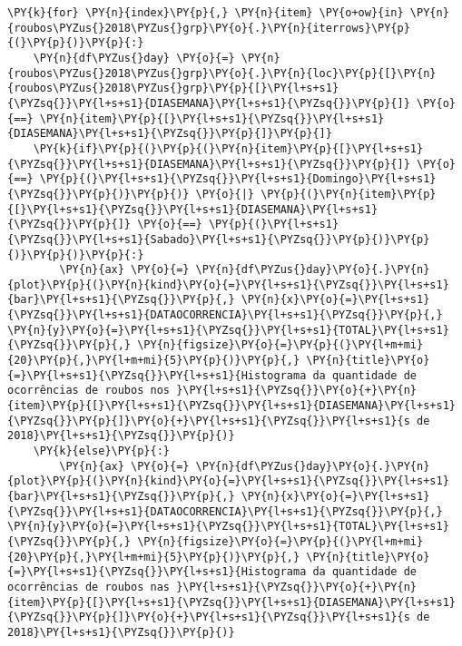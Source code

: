     \begin{tcolorbox}[breakable, size=fbox, boxrule=1pt, pad at break*=1mm,colback=cellbackground, colframe=cellborder]
\begin{Verbatim}[commandchars=\\\{\}]
\PY{k}{for} \PY{n}{index}\PY{p}{,} \PY{n}{item} \PY{o+ow}{in} \PY{n}{roubos\PYZus{}2018\PYZus{}grp}\PY{o}{.}\PY{n}{iterrows}\PY{p}{(}\PY{p}{)}\PY{p}{:}
    \PY{n}{df\PYZus{}day} \PY{o}{=} \PY{n}{roubos\PYZus{}2018\PYZus{}grp}\PY{o}{.}\PY{n}{loc}\PY{p}{[}\PY{n}{roubos\PYZus{}2018\PYZus{}grp}\PY{p}{[}\PY{l+s+s1}{\PYZsq{}}\PY{l+s+s1}{DIASEMANA}\PY{l+s+s1}{\PYZsq{}}\PY{p}{]} \PY{o}{==} \PY{n}{item}\PY{p}{[}\PY{l+s+s1}{\PYZsq{}}\PY{l+s+s1}{DIASEMANA}\PY{l+s+s1}{\PYZsq{}}\PY{p}{]}\PY{p}{]}
    \PY{k}{if}\PY{p}{(}\PY{p}{(}\PY{n}{item}\PY{p}{[}\PY{l+s+s1}{\PYZsq{}}\PY{l+s+s1}{DIASEMANA}\PY{l+s+s1}{\PYZsq{}}\PY{p}{]} \PY{o}{==} \PY{p}{(}\PY{l+s+s1}{\PYZsq{}}\PY{l+s+s1}{Domingo}\PY{l+s+s1}{\PYZsq{}}\PY{p}{)}\PY{p}{)} \PY{o}{|} \PY{p}{(}\PY{n}{item}\PY{p}{[}\PY{l+s+s1}{\PYZsq{}}\PY{l+s+s1}{DIASEMANA}\PY{l+s+s1}{\PYZsq{}}\PY{p}{]} \PY{o}{==} \PY{p}{(}\PY{l+s+s1}{\PYZsq{}}\PY{l+s+s1}{Sabado}\PY{l+s+s1}{\PYZsq{}}\PY{p}{)}\PY{p}{)}\PY{p}{)}\PY{p}{:}
        \PY{n}{ax} \PY{o}{=} \PY{n}{df\PYZus{}day}\PY{o}{.}\PY{n}{plot}\PY{p}{(}\PY{n}{kind}\PY{o}{=}\PY{l+s+s1}{\PYZsq{}}\PY{l+s+s1}{bar}\PY{l+s+s1}{\PYZsq{}}\PY{p}{,} \PY{n}{x}\PY{o}{=}\PY{l+s+s1}{\PYZsq{}}\PY{l+s+s1}{DATAOCORRENCIA}\PY{l+s+s1}{\PYZsq{}}\PY{p}{,} \PY{n}{y}\PY{o}{=}\PY{l+s+s1}{\PYZsq{}}\PY{l+s+s1}{TOTAL}\PY{l+s+s1}{\PYZsq{}}\PY{p}{,} \PY{n}{figsize}\PY{o}{=}\PY{p}{(}\PY{l+m+mi}{20}\PY{p}{,}\PY{l+m+mi}{5}\PY{p}{)}\PY{p}{,} \PY{n}{title}\PY{o}{=}\PY{l+s+s1}{\PYZsq{}}\PY{l+s+s1}{Histograma da quantidade de ocorrências de roubos nos }\PY{l+s+s1}{\PYZsq{}}\PY{o}{+}\PY{n}{item}\PY{p}{[}\PY{l+s+s1}{\PYZsq{}}\PY{l+s+s1}{DIASEMANA}\PY{l+s+s1}{\PYZsq{}}\PY{p}{]}\PY{o}{+}\PY{l+s+s1}{\PYZsq{}}\PY{l+s+s1}{s de 2018}\PY{l+s+s1}{\PYZsq{}}\PY{p}{)}
    \PY{k}{else}\PY{p}{:}
        \PY{n}{ax} \PY{o}{=} \PY{n}{df\PYZus{}day}\PY{o}{.}\PY{n}{plot}\PY{p}{(}\PY{n}{kind}\PY{o}{=}\PY{l+s+s1}{\PYZsq{}}\PY{l+s+s1}{bar}\PY{l+s+s1}{\PYZsq{}}\PY{p}{,} \PY{n}{x}\PY{o}{=}\PY{l+s+s1}{\PYZsq{}}\PY{l+s+s1}{DATAOCORRENCIA}\PY{l+s+s1}{\PYZsq{}}\PY{p}{,} \PY{n}{y}\PY{o}{=}\PY{l+s+s1}{\PYZsq{}}\PY{l+s+s1}{TOTAL}\PY{l+s+s1}{\PYZsq{}}\PY{p}{,} \PY{n}{figsize}\PY{o}{=}\PY{p}{(}\PY{l+m+mi}{20}\PY{p}{,}\PY{l+m+mi}{5}\PY{p}{)}\PY{p}{,} \PY{n}{title}\PY{o}{=}\PY{l+s+s1}{\PYZsq{}}\PY{l+s+s1}{Histograma da quantidade de ocorrências de roubos nas }\PY{l+s+s1}{\PYZsq{}}\PY{o}{+}\PY{n}{item}\PY{p}{[}\PY{l+s+s1}{\PYZsq{}}\PY{l+s+s1}{DIASEMANA}\PY{l+s+s1}{\PYZsq{}}\PY{p}{]}\PY{o}{+}\PY{l+s+s1}{\PYZsq{}}\PY{l+s+s1}{s de 2018}\PY{l+s+s1}{\PYZsq{}}\PY{p}{)}        

\end{Verbatim}
\end{tcolorbox}
